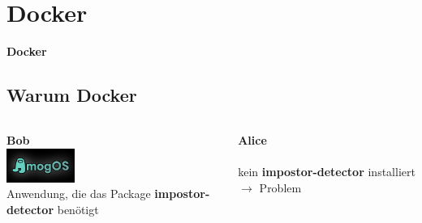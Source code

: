 \section{Docker}\label{sec:docker}

\begin{frame}[b]
    \begin{center}
        
    \end{center}
    \vfill
    \begin{flushleft}
        \Huge
        \textbf{Docker}
    \end{flushleft}
\end{frame}

\subsection{Warum Docker}\label{subsec:warumdocker}

\begin{frame}
    \slidehead
    \vspace{-1em}
    \Large
    \begin{columns}[c]
        \begin{column}{.5\textwidth}
            \centering
            \textbf{Bob} \\
            \vspace{0.5em}
            \includegraphics[height = 3em]{../pictures/amogos} \\
            Anwendung, die das Package \textbf{impostor-detector} benötigt
        \end{column}
        \pause
        \begin{column}{.5\textwidth}
            \centering
            \textbf{Alice} \\
            \vspace{0.5em}
              \\
            kein \textbf{impostor-detector} installiert $\rightarrow$ Problem
        \end{column}
    \end{columns}
\end{frame}

